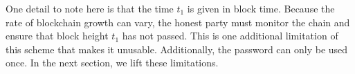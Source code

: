 One detail to note here is that the time $t_1$ is given in block time. Because the rate of
blockchain growth can vary, the honest party must monitor the chain and ensure that block
height $t_1$ has not passed. This is one additional limitation of this scheme that makes it
unusable. Additionally, the password can only be used once.
In the next section, we lift these limitations.

